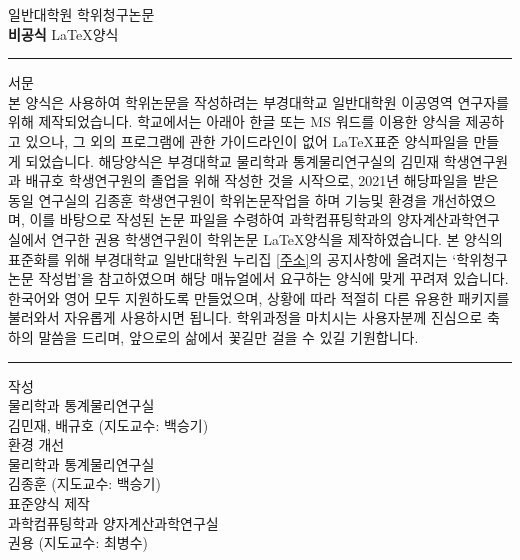 \thispagestyle{empty}

 일반대학원 학위청구논문 \\[0.2cm] \textbf{비공식} \LaTeX 양식\\[0.3cm]
\normalsize

\begin{center}
\rule{11cm}{0.5cm}
\end{center}

서문\\[0.3cm]

본 양식은  사용하여 학위논문을 작성하려는
부경대학교 일반대학원 이공영역 연구자를 위해 제작되었습니다.
학교에서는 아래아 한글 또는 MS 워드를 이용한 양식을 제공하고 있으나,
그 외의 프로그램에 관한 가이드라인이 없어 \LaTeX 표준 양식파일을 만들게 되었습니다.
해당양식은 부경대학교 물리학과 통계물리연구실의 김민재 학생연구원과
배규호 학생연구원의 졸업을 위해  작성한 것을 시작으로,
2021년 해당파일을 받은 동일 연구실의 김종훈 학생연구원이 학위논문작업을 하며
기능및 환경을 개선하였으며,
이를 바탕으로 작성된 논문 파일을 수령하여 과학컴퓨팅학과의 양자계산과학연구실에서
연구한 권용 학생연구원이 학위논문 \LaTeX 양식을 제작하였습니다.
본 양식의 표준화를 위해 부경대학교 일반대학원 누리집
\href{https://graduate.pknu.ac.kr/main}{[주소]}의 공지사항에 올려지는
`학위청구논문 작성법'을 참고하였으며 해당 매뉴얼에서 요구하는 
양식에 맞게 꾸려져 있습니다.
한국어와 영어 모두 지원하도록 만들었으며, 상황에 따라 적절히 다른  
유용한 패키지를 불러와서 자유롭게 사용하시면 됩니다. 학위과정을 마치시는 사용자분께
진심으로 축하의 말씀을 드리며, 앞으로의 삶에서 꽃길만 걸을 수 있길 기원합니다.

\begin{center}
\rule{11cm}{0.5cm}
\end{center}

\vspace{1cm}
\begin{flushright} 
 작성 \\
 물리학과 통계물리연구실 \\ 
김민재, 배규호 (지도교수: 백승기) \\[0.5cm]

 환경 개선 \\
 물리학과 통계물리연구실 \\
김종훈 (지도교수: 백승기) \\[0.5cm]

 표준양식 제작 \\
 과학컴퓨팅학과 양자계산과학연구실 \\
권용 (지도교수: 최병수) \\[0.5cm]
\end{flushright}

\newpage